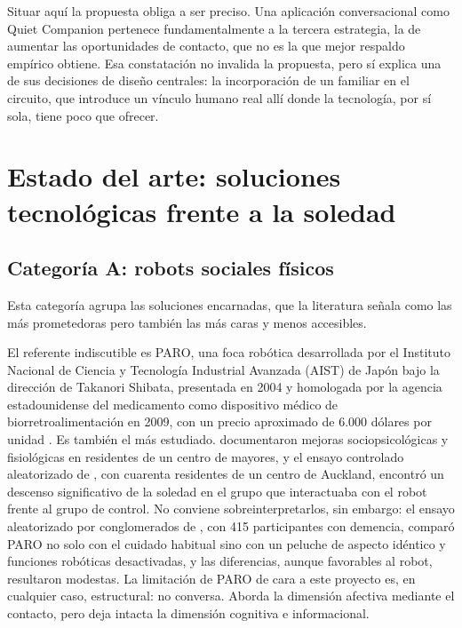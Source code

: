 Situar aquí la propuesta obliga a ser preciso. Una aplicación conversacional como Quiet Companion pertenece fundamentalmente a la tercera estrategia, la de aumentar las oportunidades de contacto, que no es la que mejor respaldo empírico obtiene. Esa constatación no invalida la propuesta, pero sí explica una de sus decisiones de diseño centrales: la incorporación de un familiar en el circuito, que introduce un vínculo humano real allí donde la tecnología, por sí sola, tiene poco que ofrecer.

\section{Estado del arte: soluciones tecnológicas frente a la soledad}
\label{estado-arte}

\subsection{Categoría A: robots sociales físicos}

Esta categoría agrupa las soluciones encarnadas, que la literatura señala como las más prometedoras pero también las más caras y menos accesibles.

El referente indiscutible es PARO, una foca robótica desarrollada por el Instituto Nacional de Ciencia y Tecnología Industrial Avanzada (AIST) de Japón bajo la dirección de Takanori Shibata, presentada en 2004 y homologada por la agencia estadounidense del medicamento como dispositivo médico de biorretroalimentación en 2009, con un precio aproximado de 6.000 dólares por unidad \citep{RobotsGuidePARO}. Es también el más estudiado. \textcite{WadaShibata2007} documentaron mejoras sociopsicológicas y fisiológicas en residentes de un centro de mayores, y el ensayo controlado aleatorizado de \textcite{Robinson2013}, con cuarenta residentes de un centro de Auckland, encontró un descenso significativo de la soledad en el grupo que interactuaba con el robot frente al grupo de control. No conviene sobreinterpretarlos, sin embargo: el ensayo aleatorizado por conglomerados de \textcite{Moyle2017}, con 415 participantes con demencia, comparó PARO no solo con el cuidado habitual sino con un peluche de aspecto idéntico y funciones robóticas desactivadas, y las diferencias, aunque favorables al robot, resultaron modestas. La limitación de PARO de cara a este proyecto es, en cualquier caso, estructural: no conversa. Aborda la dimensión afectiva mediante el contacto, pero deja intacta la dimensión cognitiva e informacional.

